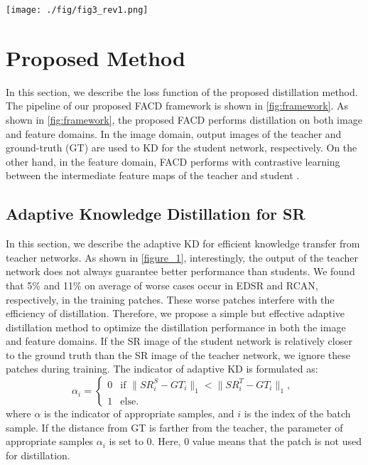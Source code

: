 \documentclass[10pt,twocolumn,letterpaper]{article}
\begin{document}
\begin{figure*}
\centering
\texttt{[image: ./fig/fig3\_rev1.png]}
\caption{Overall architecture of Feature-domain Adaptive Contrastive Distillation (FACD)\label{fig:framework}}
\end{figure*}
\section{Proposed Method}

In this section, we describe the loss function of the proposed distillation method. The pipeline of our proposed FACD framework is shown in \cref{fig:framework}. As shown in \cref{fig:framework}, the proposed FACD performs distillation on both image and feature domains. In the image domain, output images of the teacher and ground-truth (GT) are used to KD for the student network, respectively. On the other hand, in the feature domain, FACD performs with contrastive learning between the intermediate feature maps of the teacher and student \cite{fakd,lsfd}.

\subsection{Adaptive Knowledge Distillation for SR}
\label{adaptive}
In this section, we describe the adaptive KD for efficient knowledge transfer from teacher networks. As shown in \cref{figure_1}, interestingly, the output of the teacher network does not always guarantee better performance than students. We found that 5\% and 11\% on average of worse cases occur in EDSR and RCAN, respectively, in the training patches. These worse patches interfere with the efficiency of distillation. Therefore, we propose a simple but effective adaptive distillation method to optimize the distillation performance in both the image and feature domains. If the SR image of the student network is relatively closer to the ground truth than the SR image of the teacher network, we ignore these patches during training. The indicator of adaptive KD is formulated as:
\begin{equation}
  \alpha_i = \begin{cases} 0 & \text{if} \,\, \|SR_i^S-GT_i\|_1 < \|SR_i^T-GT_i\|_1, \\ 1 & \text{else}. \end{cases} \
  \label{eq:loss_aw}
\end{equation}
where \begin{math}\alpha\end{math} is the indicator of appropriate samples, and $i$ is the index of the batch sample. If the distance from GT is farther from the teacher, the parameter of appropriate samples \begin{math}\alpha_i\end{math} is set to 0. Here, 0 value means that the patch is not used for distillation.
\end{document}
